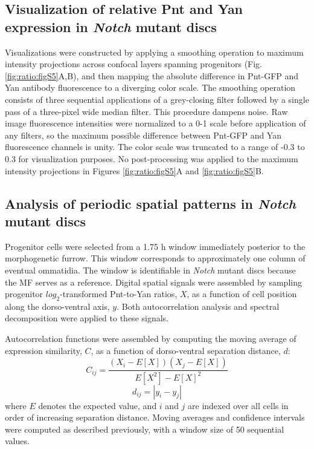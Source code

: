 \subsection{Visualization of relative Pnt and Yan expression in \textit{Notch} mutant discs}
\label{appendix:methods:ratio:notch_images}

Visualizations were constructed by applying a smoothing operation to maximum intensity projections across confocal layers spanning progenitors (Fig. \ref{fig:ratio:figS5}A,B), and then mapping the absolute difference in Pnt-GFP and Yan antibody fluorescence to a diverging color scale. The smoothing operation consists of three sequential applications of a grey-closing filter followed by a single pass of a three-pixel wide median filter. This procedure dampens noise. Raw image fluorescence intensities were normalized to a 0-1 scale before application of any filters, so the maximum possible difference between Pnt-GFP and Yan fluorescence channels is unity. The color scale was truncated to a range of -0.3 to 0.3 for visualization purposes. No post-processing was applied to the maximum intensity projections in Figures \ref{fig:ratio:figS5}A and \ref{fig:ratio:figS5}B.

\subsection{Analysis of periodic spatial patterns in \textit{Notch} mutant discs}
\label{appendix:methods:ratio:autocorrelation}

Progenitor cells were selected from a 1.75 h window immediately posterior to the morphogenetic furrow. This window corresponds to approximately one column of eventual ommatidia. The window is identifiable in \textit{Notch} mutant discs because the MF serves as a reference. Digital spatial signals were assembled by sampling progenitor $log_2$-transformed Pnt-to-Yan ratios, $X$, as a function of cell position along the dorso-ventral axis, $y$. Both autocorrelation analysis and spectral decomposition were applied to these signals.

Autocorrelation functions were assembled by computing the moving average of expression similarity, $C$, as a function of dorso-ventral separation distance, $d$:
\begin{equation}
C_{ij} = \frac{ (X_i-E[X])(X_j-E[X]) }{ E[X^2] - E[X]^2 }
\end{equation}
\begin{equation}
d_{ij} = | y_i - y_j |
\end{equation}
where $E$ denotes the expected value, and $i$ and $j$ are indexed over all cells in order of increasing separation distance. Moving averages and confidence intervals were computed as described previously, with a window size of 50 sequential values.

